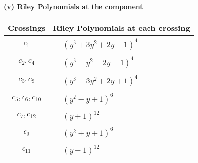 \documentclass[1p]{elsarticle_modified}
\theoremstyle{definition}
\begin{document}
\newpage\renewcommand{\arraystretch}{1}
\flushleft \textbf{(v) Riley Polynomials at the component}\newline \\
\begin{tabular}{m{50pt}|m{274pt}}
Crossings & \hspace{64pt}Riley Polynomials at each crossing \\
\hline $$\begin{aligned}c_{1}\end{aligned}$$&$\begin{aligned}
&(y^3+3 y^2+2 y-1)^4
\end{aligned}$\\
\hline $$\begin{aligned}c_{2},c_{4}\end{aligned}$$&$\begin{aligned}
&(y^3- y^2+2 y-1)^4
\end{aligned}$\\
\hline $$\begin{aligned}c_{3},c_{8}\end{aligned}$$&$\begin{aligned}
&(y^3-3 y^2+2 y+1)^4
\end{aligned}$\\
\hline $$\begin{aligned}c_{5},c_{6},c_{10}\end{aligned}$$&$\begin{aligned}
&(y^2- y+1)^6
\end{aligned}$\\
\hline $$\begin{aligned}c_{7},c_{12}\end{aligned}$$&$\begin{aligned}
&(y+1)^{12}
\end{aligned}$\\
\hline $$\begin{aligned}c_{9}\end{aligned}$$&$\begin{aligned}
&(y^2+y+1)^6
\end{aligned}$\\
\hline $$\begin{aligned}c_{11}\end{aligned}$$&$\begin{aligned}
&(y-1)^{12}
\end{aligned}$\\
\hline
\end{tabular}\\~\\
\end{document}
